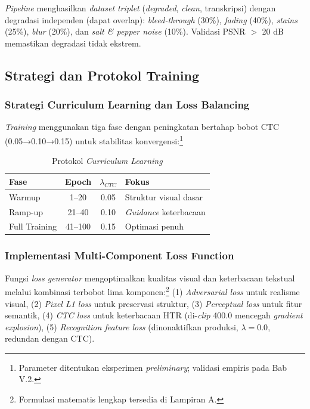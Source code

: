 \textit{Pipeline} menghasilkan \textit{dataset triplet} (\textit{degraded}, \textit{clean}, transkripsi) dengan degradasi independen (dapat overlap): \textit{bleed-through} (30\%), \textit{fading} (40\%), \textit{stains} (25\%), \textit{blur} (20\%), dan \textit{salt \& pepper noise} (10\%). Validasi PSNR $>$ 20 dB memastikan degradasi tidak ekstrem.

\subsection{Strategi dan Protokol Training}
\label{subsec:detail-implementasi-training}

\subsubsection{Strategi Curriculum Learning dan Loss Balancing}
\label{subsubsec:curriculum-learning-impl}

\textit{Training} menggunakan tiga fase dengan peningkatan bertahap bobot CTC (0.05→0.10→0.15) untuk stabilitas konvergensi:\footnote{Parameter ditentukan eksperimen \textit{preliminary}; validasi empiris pada Bab V.2.}

\begin{table}[H]
\centering
\caption{Protokol \textit{Curriculum Learning}}
\label{tab:curriculum-learning}
\small
\begin{tabular}{|l|c|c|l|}
\hline
\textbf{Fase} & \textbf{Epoch} & \textbf{$\lambda_{CTC}$} & \textbf{Fokus} \\
\hline
Warmup & 1--20 & 0.05 & Struktur visual dasar \\
Ramp-up & 21--40 & 0.10 & \textit{Guidance} keterbacaan \\
Full Training & 41--100 & 0.15 & Optimasi penuh \\
\hline
\end{tabular}
\end{table}

\subsubsection{Implementasi Multi-Component Loss Function}
\label{subsubsec:loss-implementasi}

Fungsi \textit{loss generator} mengoptimalkan kualitas visual dan keterbacaan tekstual melalui kombinasi terbobot lima komponen:\footnote{Formulasi matematis lengkap tersedia di Lampiran A.} (1) \textit{Adversarial loss} untuk realisme visual, (2) \textit{Pixel L1 loss} untuk preservasi struktur, (3) \textit{Perceptual loss} untuk fitur semantik, (4) \textit{CTC loss} untuk keterbacaan HTR (di-\textit{clip} 400.0 mencegah \textit{gradient explosion}), (5) \textit{Recognition feature loss} (dinonaktifkan produksi, $\lambda=0.0$, redundan dengan CTC).

